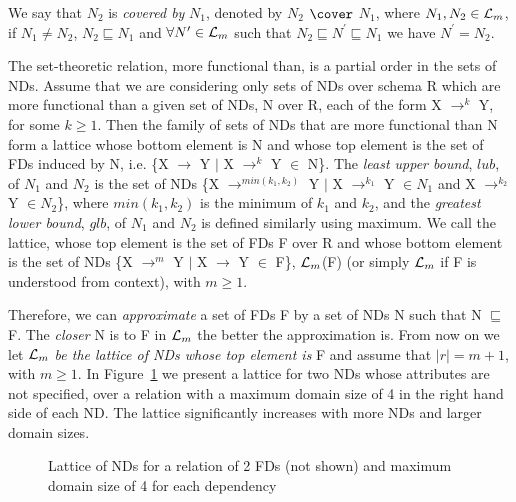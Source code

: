 \begin{definition}[Covered By]\label{def:covered}
\begin{rm}
We say that $N_2$ is {\em covered by} $N_1$, denoted by $N_2$ $\cover$ $N_1$, where $N_1, N_2 \in {\cal L}_m$, 
if $N_1 \not= N_2$, $N_2 \sqsubseteq N_1$ and
$\forall N^\prime \in {\cal L}_m$ such that 
$N_2 \sqsubseteq N^\prime \sqsubseteq N_1$ we have $N^\prime = N_2$.
\end{rm}
\end{definition}

The set-theoretic relation, more functional than, 
is a partial order in the sets of NDs.
Assume that we are considering only sets of NDs over schema R which are more functional 
than a given set of NDs, N over R, each of the form X $\to^k$ Y, 
for some $k \ge 1$.
Then the family of sets of NDs that are more functional than N form a lattice
whose bottom element is N and whose top element is the set of FDs
induced by N, i.e. \{X $\to$ Y $\mid$ X $\to^k$ Y $\in$ N\}.
The {\em least upper bound}, $lub$, of $N_1$ and $N_2$ is the set of NDs
\{X $\to^{min(k_1, k_2)}$ Y $\mid$
X $\to^{k_1}$ Y $\in N_1$ and X $\to^{k_2}$ Y $\in N_2$\},
where $min(k_1, k_2)$ is the minimum of $k_1$ and $k_2$, and the 
{\em greatest lower bound}, $glb$, of $N_1$ and $N_2$ is defined similarly using maximum.
We call the lattice, whose top element is the set of FDs F over R
and whose bottom element is the set of NDs
\{X $\to^m$ Y $\mid$ X $\to$ Y $\in$ F\}, ${\cal L}_m$(F)
(or simply ${\cal L}_m$ if F is understood from context), with $m \ge 1$.


Therefore, we can {\em approximate} a set of FDs F by a set of NDs N
such that N $\sqsubseteq$ F. 
The {\em closer} N is to F in ${\cal L}_m$ the better the approximation is.
From now on we let ${\cal L}_m$ 
{\em be the lattice of NDs whose top element is} F
and assume that $\mid r \mid = m+1$, with $m \ge 1$. In
Figure~\ref{latt:1} we present a lattice for two NDs whose attributes
are not specified, over a relation with a maximum domain size of 4 in
the right hand side of each ND. The lattice significantly increases
with more NDs and larger domain sizes.


\begin{figure}
\centerline{}
\caption{\label{latt:1}\scriptsize{Lattice of NDs for a relation of 2 FDs
(not shown) and maximum domain size of 4 for each dependency}}
\end{figure}



